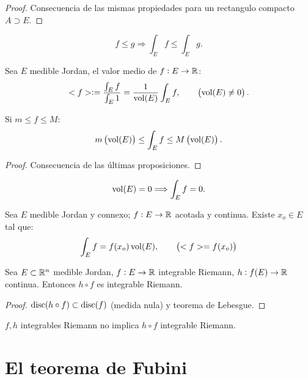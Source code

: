 \begin{proof}
    Consecuencia de las mismas propiedades para un rectangulo compacto $A \supset E$.
\end{proof}

\begin{col}[Monotonía]
    \[
    f \leq g \Longrightarrow \int_E f \leq \int_E g.
    \]
\end{col}

\begin{defi}
    Sea $E$ medible Jordan, el valor medio de $f : E \to \mathbb{R} $:
    \[
    <f> := \frac{\int_E f}{\int_E 1} = \frac{1}{\operatorname{vol}(E)} \int_E f, \qquad \left( \operatorname{vol}(E) \neq 0 \right).
    \]
\end{defi}

\begin{teo}
    Si $m \leq f \leq M$:
    \[
    m \left( \operatorname{vol}(E) \right) \leq \int_E f \leq M \left( \operatorname{vol}(E) \right).
    \]
\end{teo}

\begin{proof}
    Consecuencia de las últimas proposiciones.
\end{proof}

\begin{col}
    \[
    \operatorname{vol}(E) = 0 \Longrightarrow \int_E f = 0.
    \]
\end{col}

\begin{teo}
    Sea $E$ medible Jordan y connexo; $f : E \to \mathbb{R}$ acotada y continua. Existe $x_o \in E$ tal que:
    \[
    \int_E f = f(x_o) \operatorname{vol}(E), \qquad \left( <f> = f(x_o) \right)
    \]
\end{teo}

\begin{prop}
    Sea $E \subset \mathbb{R}^n$ medible Jordan, $f : E \to \mathbb{R}$ integrable Riemann, $h : f(E) \to \mathbb{R}$ continua. Entonces $h \circ f$ es integrable Riemann.
\end{prop}

\begin{proof}
    $\operatorname{disc}(h \circ f) \subset \operatorname{disc}(f)$ (medida nula) y teorema de Lebesgue.
\end{proof}

\begin{obs}
    $f,h$ integrables Riemann no implica $h \circ f$ integrable Riemann.
\end{obs}

\section{El teorema de Fubini}

